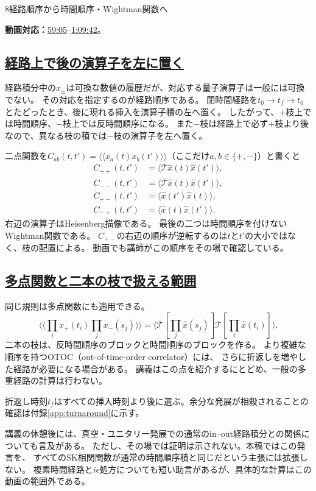 \documentclass[a4paper,11pt]{ltjsarticle}
\newcommand{\subsectionlink}[1]{\subsection[#1]{\hyperlink{toc}{#1}}}
\numberwithin{equation}{section}
\newcommand{\av}[1]{\langle #1\rangle}
\newcommand{\pav}[1]{\langle\!\langle #1\rangle\!\rangle}
\newcommand{\video}[2]{\href{https://www.youtube.com/watch?v=RYxzcUhIHjk\&t=#1s}{#2}}
\newcommand{\videosource}[1]{\par\noindent\textcolor{noteblue}{\textbf{動画対応：}#1}\par\smallskip}
\begin{document}
\begin{lecturesection}{8}{経路順序から時間順序・Wightman関数へ}
\label{sec:ordering}
\videosource{\video{3545}{59:05}--\video{4182}{1:09:42}。}
\subsectionlink{経路上で後の演算子を左に置く}
経路積分中の$x_\pm$は可換な数値の履歴だが、対応する量子演算子は一般には可換でない。
その対応を指定するのが経路順序である。
閉時間経路を$t_0\to t_f\to t_0$とたどったとき、後に現れる挿入を演算子積の左へ置く。
したがって、$+$枝上では時間順序、$-$枝上では反時間順序になる。
また$-$枝は経路上で必ず$+$枝より後なので、異なる枝の積では$-$枝の演算子を左へ置く。

二点関数を$C_{ab}(t,t')=\pav{x_a(t)x_b(t')}$（ここだけ$a,b\in\{+,-\}$）と書くと
\begin{align}
 C_{++}(t,t')&=\av{\mathcal T\hat x(t)\hat x(t')},\\
 C_{--}(t,t')&=\av{\overline{\mathcal T}\hat x(t)\hat x(t')},\\
 C_{+-}(t,t')&=\av{\hat x(t')\hat x(t)},\label{eq:cpm}\\
 C_{-+}(t,t')&=\av{\hat x(t)\hat x(t')}.\label{eq:cmp}
\end{align}
右辺の演算子はHeisenberg描像である。
最後の二つは時間順序を付けないWightman関数である。
$C_{+-}$の右辺の順序が逆転するのは$t$と$t'$の大小ではなく、枝の配置による。
動画でも講師がこの順序をその場で確認している。

\subsectionlink{多点関数と二本の枝で扱える範囲}
同じ規則は多点関数にも適用できる。
\begin{equation}
 \pav{\prod_i x_+(t_i)\prod_j x_-(s_j)}
  =\av{\overline{\mathcal T}\left[\prod_j\hat x(s_j)\right]
          \mathcal T\left[\prod_i\hat x(t_i)\right]}.
\end{equation}
二本の枝は、反時間順序のブロックと時間順序のブロックを作る。
より複雑な順序を持つOTOC（out-of-time-order correlator）には、
さらに折返しを増やした経路が必要になる場合がある。
講義はこの点を紹介するにとどめ、一般の多重経路の計算は行わない。

折返し時刻$t_f$はすべての挿入時刻より後に選ぶ。余分な発展が相殺されることの確認は付録\ref{app:turnaround}に示す。

講義の休憩後には、真空・ユニタリー発展での通常のin--out経路積分との関係についても言及がある。
ただし、その場では証明は示されない。本稿ではこの発言を、
すべてのSK相関関数が通常の時間順序積と同じだという主張には拡張しない。
複素時間経路と$i\epsilon$処方についても短い助言があるが、具体的な計算はこの動画の範囲外である。
\end{lecturesection}
\end{document}
